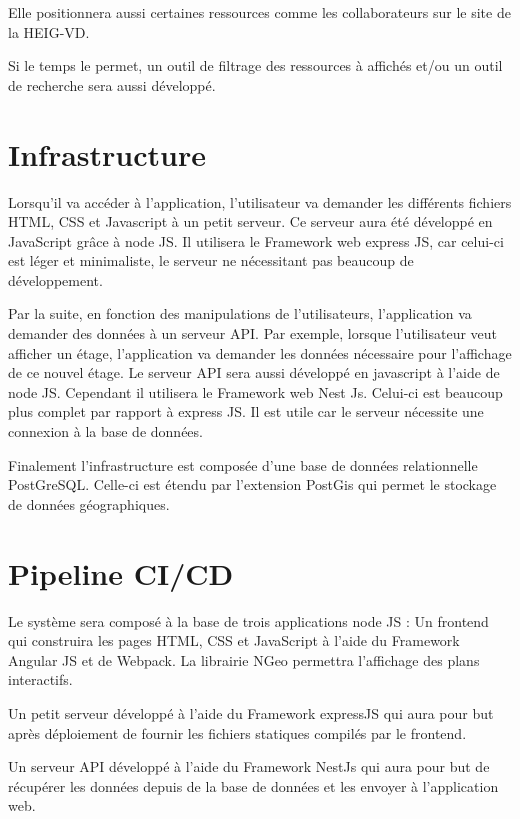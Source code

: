 \documentclass[
    iai, %
    il, %
]{heig-tb}
\begin{document}
Elle positionnera aussi certaines ressources comme les collaborateurs sur le site de la HEIG-VD.

Si le temps le permet, un outil de filtrage des ressources à affichés et/ou un outil de recherche sera aussi développé.

\section{Infrastructure}


Lorsqu'il va accéder à l'application, l'utilisateur va demander les différents fichiers HTML, CSS et Javascript à un petit serveur.
Ce serveur aura été développé en JavaScript grâce à node JS.
Il utilisera le Framework web express JS, car celui-ci est léger et minimaliste, le serveur ne nécessitant pas beaucoup de développement.

Par la suite, en fonction des manipulations de l'utilisateurs, l'application va demander des données à un serveur API.
Par exemple, lorsque l'utilisateur veut afficher un étage, l'application va demander les données nécessaire pour l'affichage de ce nouvel étage.
Le serveur API sera aussi développé en javascript à l'aide de node JS. Cependant il utilisera le Framework web Nest Js.
Celui-ci est beaucoup plus complet par rapport à express JS. Il est utile car le serveur nécessite une connexion à la base de données.

Finalement l'infrastructure est composée d'une base de données relationnelle PostGreSQL.
Celle-ci est étendu par l'extension PostGis qui permet le stockage de données géographiques.

\section{Pipeline CI/CD}


Le système sera composé à la base de trois applications node JS :
Un frontend qui construira les pages HTML, CSS et JavaScript à l'aide du Framework Angular JS et de Webpack.
La librairie NGeo permettra l'affichage des plans interactifs.

Un petit serveur développé à l'aide du Framework expressJS qui aura pour but après déploiement de fournir les fichiers statiques compilés par le frontend.

Un serveur API développé à l'aide du Framework NestJs qui aura pour but de récupérer les données depuis de la base de données et les envoyer à l'application web.
\end{document}
